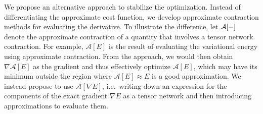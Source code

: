 We propose an alternative approach to stabilize the optimization.
%
Instead of differentiating the approximate cost function, we develop approximate contraction methods for evaluating the derivative.
%
To illustrate the difference, let $\mathcal{A}[{-}]$ denote the approximate contraction of a quantity that involves a tensor network contraction.
%
For example, $\mathcal{A}[E]$ is the result of evaluating the variational energy using approximate contraction.
%
From the  approach, we would then obtain $\nabla \mathcal{A}[E]$ as the gradient and thus effectively optimize $\mathcal{A}[E]$, which may have its minimum outside the region where $\mathcal{A}[E] \approx E$ is a good approximation.
%
We instead propose to use $\mathcal{A}[\nabla E]$, i.e.~writing down an expression for the components of the exact gradient $\nabla E$ as a tensor network and then introducing approximations to evaluate them.




